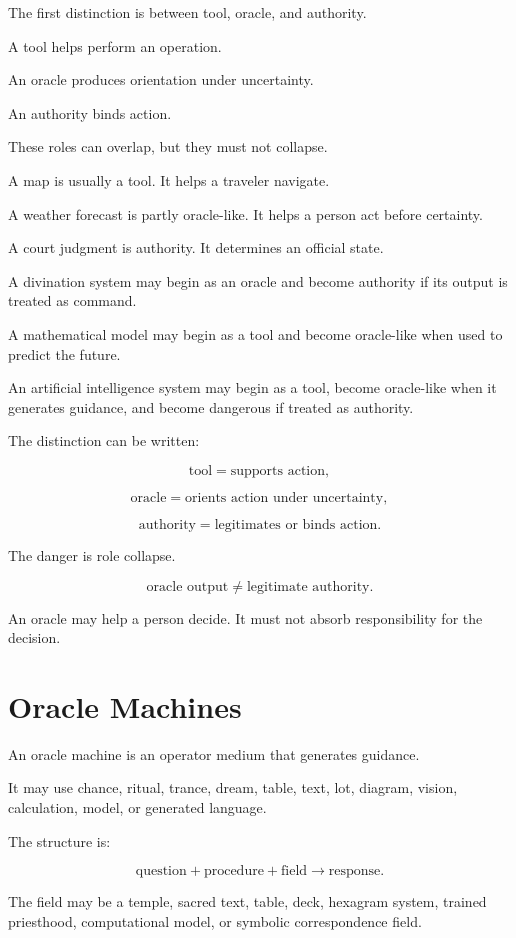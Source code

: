 \documentclass[11pt]{book}
\begin{document}
The first distinction is between tool, oracle, and authority.

A tool helps perform an operation.

An oracle produces orientation under uncertainty.

An authority binds action.

These roles can overlap, but they must not collapse.

A map is usually a tool. It helps a traveler navigate.

A weather forecast is partly oracle-like. It helps a person act before certainty.

A court judgment is authority. It determines an official state.

A divination system may begin as an oracle and become authority if its output is treated as command.

A mathematical model may begin as a tool and become oracle-like when used to predict the future.

An artificial intelligence system may begin as a tool, become oracle-like when it generates guidance, and become dangerous if treated as authority.

The distinction can be written:

\[
\text{tool} = \text{supports action},
\]

\[
\text{oracle} = \text{orients action under uncertainty},
\]

\[
\text{authority} = \text{legitimates or binds action}.
\]

The danger is role collapse.

\[
\text{oracle output} \neq \text{legitimate authority}.
\]

An oracle may help a person decide. It must not absorb responsibility for the decision.

\section{Oracle Machines}

An oracle machine is an operator medium that generates guidance.

It may use chance, ritual, trance, dream, table, text, lot, diagram, vision, calculation, model, or generated language.

The structure is:

\[
\text{question}
+
\text{procedure}
+
\text{field}
\rightarrow
\text{response}.
\]

The field may be a temple, sacred text, table, deck, hexagram system, trained priesthood, computational model, or symbolic correspondence field.
\end{document}
